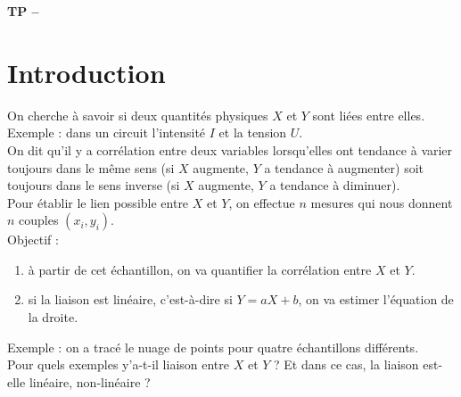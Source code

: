 





\begin{center}
{\Large\bf TP \no {\num} -- \descrip}
\end{center}



\section{Introduction}
\noindent On cherche \` a savoir si deux quantit\' es physiques $X$ et $Y$ sont li\' ees entre elles. Exemple : dans un circuit l'intensit\' e $I$ et la tension $U$.  \\
On dit qu'il y a corr\' elation entre deux variables lorsqu'elles ont tendance \` a varier toujours dans le m\^ eme sens (si $X$ augmente, $Y$ a tendance \` a augmenter) soit toujours dans le sens inverse (si $X$ augmente, $Y$ a tendance \` a diminuer).\\
Pour \' etablir le lien possible entre $X$ et $Y$, on effectue $n$ mesures qui nous donnent $n$ couples $(x_i,y_i)$. \\
Objectif :
\begin{enumerate}
 \item \` a partir de cet \' echantillon, on va quantifier la corr\' elation entre $X$ et $Y$.
 \item si la liaison est lin\' eaire, c'est-\` a-dire si $Y=aX+b$, on va estimer l'\' equation de la droite.
 \end{enumerate} 
Exemple : on a trac\' e le nuage de points pour quatre \' echantillons diff\' erents.\\
Pour quels exemples y'a-t-il liaison entre $X$ et $Y$ ? Et dans ce cas, la liaison est-elle lin\' eaire, non-lin\' eaire ?
